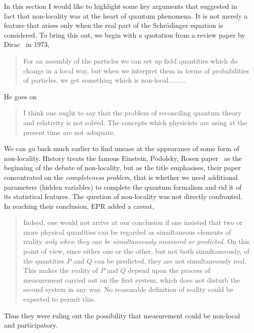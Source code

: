 \documentclass[11pt]{article}
\begin{document}
In this section I would like to highlight some key arguments that suggested in fact that non-locality was at the heart of quantum phenomena.   It is not merely a feature that arises only when the real part of the Schr\"{o}dinger equation is considered.  To bring this out,
we begin with a quotation from a review paper by Dirac~\cite{pd73} in 1973,
\begin{quote}
For an assembly of the particles we can set up field quantities which do change in a local way, but when we interpret them in terms of probabilities of particles, we get something which is non-local.........
\end{quote}
He goes on
\begin{quote}
 I think one ought to say that the problem of reconciling quantum theory and relativity is not solved.  The concepts which physicists are using at the present time are not adequate. 
 \end{quote}
 We can go back much earlier to find unease at the  appearance of some form of non-locality.  History treats the famous Einstein, Podolsky, Rosen paper~\cite{epr35} 
 as the beginning of the debate of non-locality, but as the title emphasises,  their paper concentrated on the {\em completeness problem}, that is whether we need additional parameters (hidden variables) to complete the quantum formalism and rid it of its statistical features. The question of non-locality was not directly confronted.  
 In reaching their conclusion, EPR added a caveat, 
 \begin{quote}
 Indeed, one would not arrive at our conclusion if one insisted that two or more physical quantities can be regarded as simultaneous elements of reality {\em only when they can be simultaneously measured or predicted}. On this point of view, since either one or the other,  but not both simultaneously, of the quantities $P$ and $Q$ can be predicted, they are not simultaneously real.  This makes the reality of $P$ and $Q$ depend upon the process of measurement carried out on the first system, which does not disturb the second system in any way.
  No reasonable definition of reality could be expected to permit this.
 \end{quote}
 Thus they were ruling out the possibility that measurement could be non-local and participatory.
 
\end{document}
